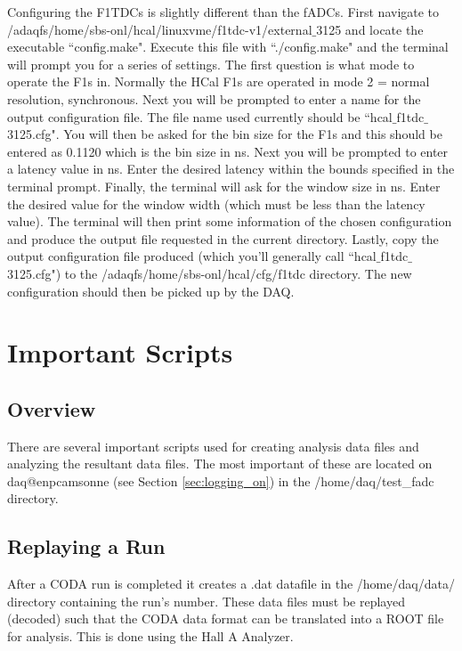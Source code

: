 \documentclass[oneside]{book}   %
\begin{document}
Configuring the F1TDCs is slightly different than the fADCs. First navigate to /adaqfs/home/sbs-onl/hcal/linuxvme/f1tdc-v1/external$\_$3125 and locate the executable ``config.make". Execute this file with ``./config.make" and the terminal will prompt you for a series of settings. The first question is what mode to operate the F1s in. Normally the HCal F1s are operated in mode 2 = normal resolution, synchronous. Next you will be prompted to enter a name for the output configuration file. The file name used currently should be ``hcal$\_$f1tdc$\_$3125.cfg". You will then be asked for the bin size for the F1s and this should be entered as 0.1120  which is the bin size in ns. Next you will be prompted to enter a latency value in ns. Enter the desired latency  within the bounds specified in the terminal prompt. Finally, the terminal will ask for the window size in ns. Enter the desired value for the window width (which must be less than the latency value). The terminal will then print some information of the chosen configuration and produce the output file requested in the current directory. Lastly, copy the output configuration file produced (which you'll generally call ``hcal$\_$f1tdc$\_$3125.cfg") to the /adaqfs/home/sbs-onl/hcal/cfg/f1tdc directory. The new configuration should then be picked up by the DAQ. \\ 


\chapter{Important Scripts}
\label{ch:scripts}

\section{Overview}
\label{sec:scripts_overview}

There are several important scripts used for creating analysis data files and analyzing the resultant data files. The most important of these are located on daq@enpcamsonne (see Section \cref{sec:logging_on}) in the /home/daq/test\_fadc directory.

\section{Replaying a Run}
\label{sec:replay}

After a CODA run is completed it creates a .dat datafile in the /home/daq/data/ directory containing the run's number. These data files must be replayed (decoded) such that the CODA data format can be translated into a ROOT file for analysis. This is done using the Hall A Analyzer.
\end{document}
